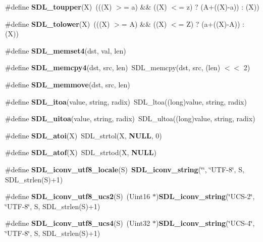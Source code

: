 \begin{DoxyCompactItemize}
\item 
\#define {\bfseries S\+D\+L\+\_\+toupper}(X)~(((X) $>$= \textquotesingle{}a\textquotesingle{}) \&\& ((X) $<$= \textquotesingle{}z\textquotesingle{}) ? (\textquotesingle{}A\textquotesingle{}+((X)-\/\textquotesingle{}a\textquotesingle{})) \+: (X))\label{_s_d_l__stdinc_8h_a96a014e239602e28e6f60e55d1b4575c}

\item 
\#define {\bfseries S\+D\+L\+\_\+tolower}(X)~(((X) $>$= \textquotesingle{}A\textquotesingle{}) \&\& ((X) $<$= \textquotesingle{}Z\textquotesingle{}) ? (\textquotesingle{}a\textquotesingle{}+((X)-\/\textquotesingle{}A\textquotesingle{})) \+: (X))\label{_s_d_l__stdinc_8h_a699ba624e92f37cca06fe4e3d2585a9a}

\item 
\#define {\bfseries S\+D\+L\+\_\+memset4}(dst,  val,  len)
\item 
\#define {\bfseries S\+D\+L\+\_\+memcpy4}(dst,  src,  len)~S\+D\+L\+\_\+memcpy(dst, src, (len) $<$$<$ 2)\label{_s_d_l__stdinc_8h_a2e2865567a13077bfe2064d6e3676882}

\item 
\#define {\bfseries S\+D\+L\+\_\+memmove}(dst,  src,  len)
\item 
\#define {\bfseries S\+D\+L\+\_\+itoa}(value,  string,  radix)~S\+D\+L\+\_\+ltoa((long)value, string, radix)\label{_s_d_l__stdinc_8h_a4d3cec8968ce9507b75c9bd52b19c5d2}

\item 
\#define {\bfseries S\+D\+L\+\_\+uitoa}(value,  string,  radix)~S\+D\+L\+\_\+ultoa((long)value, string, radix)\label{_s_d_l__stdinc_8h_ab3883d5bd0c48bf216b8b141efb01652}

\item 
\#define {\bfseries S\+D\+L\+\_\+atoi}(X)~S\+D\+L\+\_\+strtol(X, {\bf N\+U\+L\+L}, 0)\label{_s_d_l__stdinc_8h_a3a45553689babd8457e452ea29a9b79b}

\item 
\#define {\bfseries S\+D\+L\+\_\+atof}(X)~S\+D\+L\+\_\+strtod(X, {\bf N\+U\+L\+L})\label{_s_d_l__stdinc_8h_ad066e3362eba7fe2c11fdefc18d06c7f}

\item 
\#define {\bfseries S\+D\+L\+\_\+iconv\+\_\+utf8\+\_\+locale}(S)~{\bf S\+D\+L\+\_\+iconv\+\_\+string}(\char`\"{}\char`\"{}, \char`\"{}U\+T\+F-\/8\char`\"{}, S, S\+D\+L\+\_\+strlen(S)+1)\label{_s_d_l__stdinc_8h_a773e5f83e392495ad8abab8d71aa84c6}

\item 
\#define {\bfseries S\+D\+L\+\_\+iconv\+\_\+utf8\+\_\+ucs2}(S)~(Uint16 $\ast$){\bf S\+D\+L\+\_\+iconv\+\_\+string}(\char`\"{}U\+C\+S-\/2\char`\"{}, \char`\"{}U\+T\+F-\/8\char`\"{}, S, S\+D\+L\+\_\+strlen(S)+1)\label{_s_d_l__stdinc_8h_a59cd43c02306558671fe05c23284ab3b}

\item 
\#define {\bfseries S\+D\+L\+\_\+iconv\+\_\+utf8\+\_\+ucs4}(S)~(Uint32 $\ast$){\bf S\+D\+L\+\_\+iconv\+\_\+string}(\char`\"{}U\+C\+S-\/4\char`\"{}, \char`\"{}U\+T\+F-\/8\char`\"{}, S, S\+D\+L\+\_\+strlen(S)+1)\label{_s_d_l__stdinc_8h_acdced7c8985d280d87e659f583a5479e}

\end{DoxyCompactItemize}
